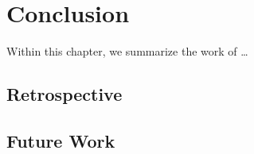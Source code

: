 \setchaptertoc
\chapter{Conclusion}\label{chp:conclusion}
\begin{summary}
   Within this chapter, we summarize the work of \ldots
\end{summary}

\section{Retrospective}

\section{Future Work}